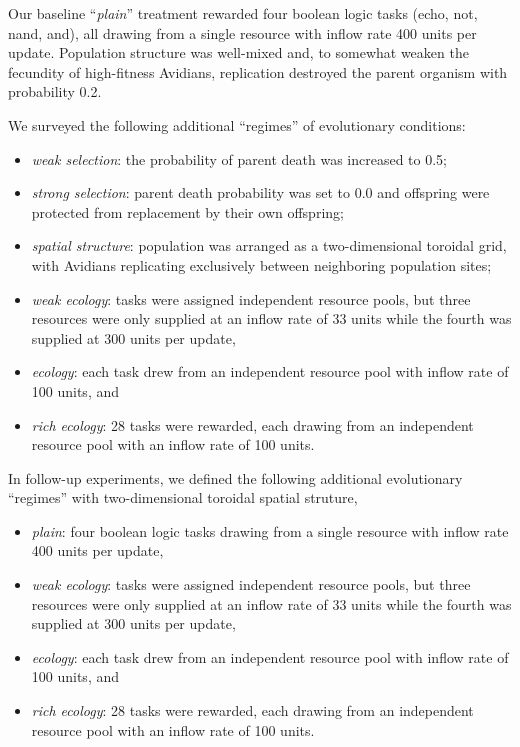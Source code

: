 Our baseline ``\textit{plain}'' treatment rewarded four boolean logic tasks (echo, not, nand, and), all drawing from a single resource with inflow rate 400 units per update.
Population structure was well-mixed and, to somewhat weaken the fecundity of high-fitness Avidians, replication destroyed the parent organism with probability 0.2.

We surveyed the following additional ``regimes'' of evolutionary conditions:
\begin{itemize}
  \item \textit{weak selection}: the probability of parent death was increased to 0.5;
  \item \textit{strong selection}: parent death probability was set to 0.0 and offspring were protected from replacement by their own offspring;
  \item \textit{spatial structure}: population was arranged as a two-dimensional toroidal grid, with Avidians replicating exclusively between neighboring population sites;
  \item \textit{weak ecology}: tasks were assigned independent resource pools, but three resources were only supplied at an inflow rate of 33 units while the fourth was supplied at 300 units per update,
  \item \textit{ecology}: each task drew from an independent resource pool with inflow rate of 100 units, and
  \item \textit{rich ecology}: 28 tasks were rewarded, each drawing from an independent resource pool with an inflow rate of 100 units.
\end{itemize}

In follow-up experiments, we defined the following additional evolutionary ``regimes'' with two-dimensional toroidal spatial struture,
\begin{itemize}
  \item \textit{plain}: four boolean logic tasks drawing from a single resource with inflow rate 400 units per update,
  \item \textit{weak ecology}: tasks were assigned independent resource pools, but three resources were only supplied at an inflow rate of 33 units while the fourth was supplied at 300 units per update,
  \item \textit{ecology}: each task drew from an independent resource pool with inflow rate of 100 units, and
  \item \textit{rich ecology}: 28 tasks were rewarded, each drawing from an independent resource pool with an inflow rate of 100 units.
\end{itemize}

